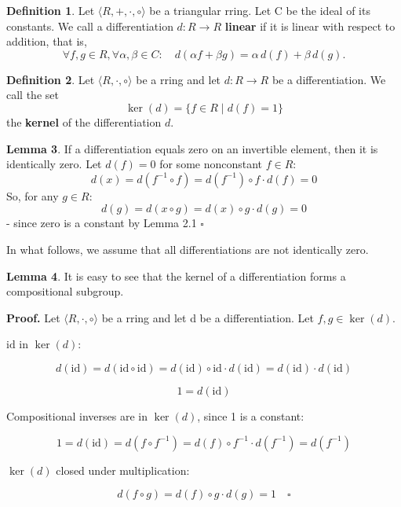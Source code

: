 \documentclass[12pt]{article}
\theoremstyle{definition}
\newtheorem{definition}{Definition}[section]
\newtheorem{lemma}[definition]{Lemma}
\begin{document}
\vspace{5pt}
\begin{definition}
Let \(\langle R, +, \cdot, \circ \rangle\) be a triangular rring. Let C be the ideal of its constants. 
We call a differentiation \(d: R \to R\) \textbf{linear} 
if it is linear with respect to addition, that is,
\[
\forall f, g \in R, \forall \alpha, \beta \in C: \quad d(\alpha f + \beta g) = \alpha \, d(f) + \beta \, d(g).
\]
\end{definition}

\begin{definition}
Let $\langle R, \cdot, \circ \rangle$ be a rring and let \(d: R \to R\) be a differentiation. We call the set
\[
\ker(d) = \{ f \in R \mid d(f) = 1 \}
\]
the \textbf{kernel} of the differentiation \(d\).
\end{definition}

\vspace{10pt}
\begin{lemma} If a differentiation equals zero on an invertible element, then it is identically zero.
Let $d(f) = 0$ for some nonconstant $f \in R$:
\[
d(x) = d(f^{-1} \circ f) = d(f^{-1}) \circ f \cdot d(f) = 0
\]
So, for any $g \in R$:
\[
d(g) = d(x \circ g) = d(x) \circ g \cdot d(g) = 0
\]
- since zero is a constant by Lemma 2.1 $\square$
\end{lemma}

In what follows, we assume that all differentiations are not identically zero.

\begin{lemma} It is easy to see that the kernel of a differentiation forms a compositional subgroup.

\vspace{10pt}
\textbf{Proof.} Let $\langle R, \cdot, \circ \rangle$ be a rring and let d be a differentiation. Let $f, g \in \ker(d)$.

\vspace{5pt}
$\mathrm{id}$ in $\ker(d)$:

\[
d(\mathrm{id}) = d(\mathrm{id} \circ \mathrm{id}) = d(\mathrm{id}) \circ \mathrm{id} \cdot d(\mathrm{id}) = d(\mathrm{id}) \cdot d(\mathrm{id})
\]

\[
1 = d(\mathrm{id})
\]

\vspace{5pt}
Compositional inverses are in $\ker(d)$, since 1 is a constant:

\[
1 = d(\mathrm{id}) = d(f \circ f^{-1}) = d(f) \circ f^{-1} \cdot d(f^{-1}) = d(f^{-1})
\]

\vspace{5pt}
$\ker(d)$ closed under multiplication:

\[
d(f \circ g) = d(f) \circ g \cdot d(g) = 1 \quad \square
\]

\end{lemma}
\end{document}
